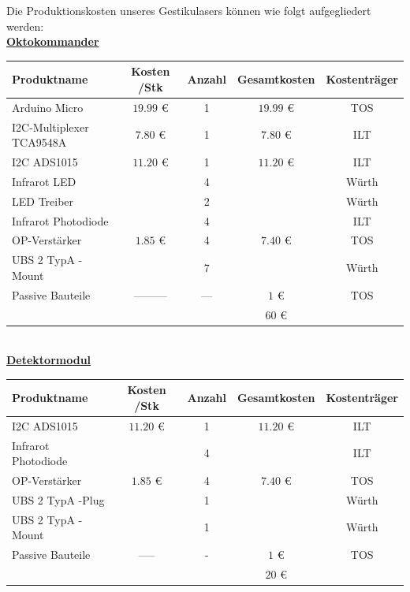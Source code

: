 Die Produktionskosten unseres Gestikulasers können wie folgt aufgegliedert werden:\\

\large{\underline{\textbf{Oktokommander}}} \\ 

\normalsize
\begin{tabularx}{\textwidth}{p{4.5cm} | c c c c}

Produktname 			& Kosten /Stk 		& Anzahl & Gesamtkosten    & Kostenträger \\ \hline
Arduino Micro 			& $19.99$ \euro{}   &   1    & $19.99$ \euro{} & TOS 	\\ [2mm]
I2C-Multiplexer TCA9548A& $7.80$ \euro{}    &   1    & $7.80$ \euro{}  & ILT    \\ [8mm]
I2C ADS1015				& $11.20$ \euro{}   &   1    & $11.20$ \euro{} & ILT    \\ [2mm]
Infrarot LED    		&					&   4    &				   & Würth  \\ [2mm]
LED Treiber     		&                   &   2    &                 & Würth  \\ [2mm]
Infrarot Photodiode 	&					&   4    &                 & ILT	\\ [8mm] 
OP-Verstärker    		& $1.85$ \euro{}    &	4    & $7.40$ \euro{}  & TOS    \\ [2mm]
UBS 2 TypA -Mount		&                   &   7    &                 & Würth  \\ [2mm]
Passive Bauteile    	&	---------       &   ---  &	$1$ \euro{}	   & TOS    \\ [2mm]\hline
						&					&		 & $  60  $	\euro{}&

\end{tabularx}\\

\large{\underline{\textbf{Detektormodul}}} \\ 

\normalsize
\begin{tabularx}{\textwidth}{p{4.5cm} | c c c c}

Produktname 			& Kosten /Stk 		& Anzahl & Gesamtkosten    & Kostenträger \\ \hline
I2C ADS1015				& $11.20$ \euro{}   &   1    & $11.20$ \euro{} & ILT    \\ [2mm]
Infrarot Photodiode 	&					&   4    &                 & ILT	\\ [8mm]
OP-Verstärker    		& $1.85$ \euro{}    &	4    & $7.40$ \euro{}  & TOS    \\ [2mm]
UBS 2 TypA -Plug		&                   &   1    &                 & Würth  \\ [2mm]
UBS 2 TypA -Mount		&                   &   1    &                 & Würth  \\ [2mm]
Passive Bauteile    	&	-----  	        &	-	 &	$1$ \euro{}	   & TOS    \\ [2mm]\hline
						&					&		 & $  20  $	\euro{}&
					
\end{tabularx} \\


